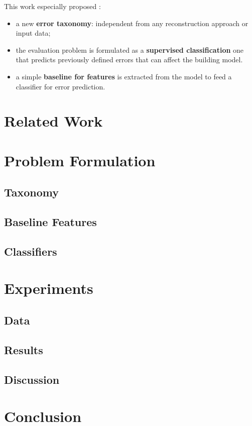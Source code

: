 \documentclass[runningheads]{llncs}
\begin{document}
	This work especially proposed :
	\begin{itemize}
		\item a new \textbf{error taxonomy}: independent from any reconstruction approach or input data;
		\item the evaluation problem is formulated as a \textbf{supervised classification} one that predicts previously defined errors that can affect the building model.
		\item a simple \textbf{baseline for features} is extracted from the model to feed a classifier for error prediction.
	\end{itemize}
\section{Related Work}
\section{Problem Formulation}
\subsection{Taxonomy}
\subsection{Baseline Features}
\subsection{Classifiers}
\section{Experiments}
\subsection{Data}
\subsection{Results}
\subsection{Discussion}
\section{Conclusion}



\end{document}
